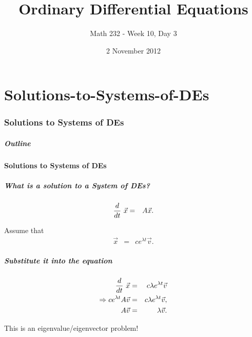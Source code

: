 \part{Solutions-to-Systems-of-DEs}
\section{Solutions to Systems of DEs}


\title{Ordinary Differential Equations}
\subtitle{Math 232 - Week 10, Day 3}
\date{2 November 2012}

\begin{frame}
  \titlepage
\end{frame}

\begin{frame}
  \frametitle{Outline}
\end{frame}


\subsection{Solutions to Systems of DEs}


\begin{frame}
  \frametitle{What is a solution to a System of DEs?}

  \begin{eqnarray*}
    \deriv{~}{t} \vec{x} & = & A \vec{x}.
  \end{eqnarray*}

  {
    Assume that 
    \begin{eqnarray*}
      \vec{x} & = & c e^{\lambda t} \vec{v}.
    \end{eqnarray*}
  }


\end{frame}


\begin{frame}
  \frametitle{Substitute it into the equation}

  \begin{eqnarray*}
    \deriv{~}{t} \vec{x} & = & c \lambda e^{\lambda t} \vec{v} \\
    \Rightarrow c  e^{\lambda t} A \vec{v} & = & c \lambda e^{\lambda t} \vec{v}, \\
    A \vec{v} & = & \lambda \vec{v}.
  \end{eqnarray*}

  This is an eigenvalue/eigenvector problem!

\end{frame}


